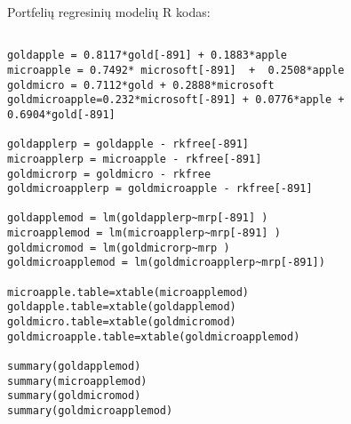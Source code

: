 \documentclass[12pt, a14paper, lithuanian]{article}
\begin{document}
 Portfelių regresinių modelių R kodas:
\begin{verbatim}

goldapple = 0.8117*gold[-891] + 0.1883*apple 
microapple = 0.7492* microsoft[-891]  +  0.2508*apple 
goldmicro = 0.7112*gold + 0.2888*microsoft 
goldmicroapple=0.232*microsoft[-891] + 0.0776*apple + 0.6904*gold[-891]

goldapplerp = goldapple - rkfree[-891]
microapplerp = microapple - rkfree[-891]
goldmicrorp = goldmicro - rkfree
goldmicroapplerp = goldmicroapple - rkfree[-891]

goldapplemod = lm(goldapplerp~mrp[-891] )
microapplemod = lm(microapplerp~mrp[-891] )
goldmicromod = lm(goldmicrorp~mrp )
goldmicroapplemod = lm(goldmicroapplerp~mrp[-891])

microapple.table=xtable(microapplemod)
goldapple.table=xtable(goldapplemod)
goldmicro.table=xtable(goldmicromod)
goldmicroapple.table=xtable(goldmicroapplemod)

summary(goldapplemod)
summary(microapplemod)
summary(goldmicromod)
summary(goldmicroapplemod)


\end{verbatim}
\end{document}
